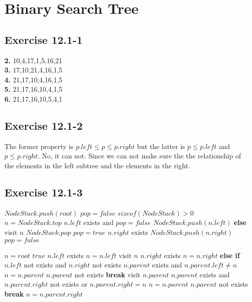 \documentclass[12pt]{article}
\theoremstyle{definition}
\theoremstyle{remark}
\begin{document}
\section{Binary Search Tree}
\subsection*{Exercise 12.1-1}
\textbf{2.} 10,4,17,1,5,16,21\\
\textbf{3.} 17,10,21,4,16,1,5\\
\textbf{4.} 21,17,10,4,16,1,5\\
\textbf{5.} 21,17,16,10,4,1,5\\
\textbf{6.} 21,17,16,10,5,4,1
\subsection*{Exercise 12.1-2}
The former property is $p.left\le p\le p.right$ but the latter is $p\le p.left$ and $p\le p.right$. No, it can not. Since we can not make sure the the relationship of the elements in the left subtree and the elements in the right.
\subsection*{Exercise 12.1-3}
\begin{codebox}
\li $NodeStack.push(root)$
\li $pop=false$
\li \While $sizeof(NodeStack)>0$ \label{li:while}
\li \quad $n=NodeStack.top$
\li \quad \If $n.left$ exists and $pop = false$ \label{li:if}
\li \qquad $NodeStack.push(n.left)$
\li \quad \textbf{else}
\li \qquad visit $n$
\li \qquad $NodeStack.pop$
\li \qquad $pop = true$
\li \qquad \If $n.right$ exists \label{li:if}
\li \quad \qquad $NodeStack.push(n.right)$
\li \quad \qquad $pop = false$
\end{codebox}
\begin{codebox}
\li $n=root$
\li \While $true$ \label{li:while}
\li \quad \While $n.left$ exists \label{li:while}
\li \qquad $n=n.left$
\li \quad visit $n$
\li \quad \If $n.right$ exists \label{li:if}
\li \qquad $n=n.right$
\li \quad \textbf{else if} $n.left$ not exists and $n.right$ not exists
\li \qquad \While $n.parent$ exists and $n.parent.left\ne n$
\li \qquad \quad $n=n.parent$
\li \qquad \If $n.parent$ not exists \label{li:if}
\li \qquad \quad \textbf{break}
\li \qquad visit $n.parent$
\li \qquad \While $n.parent$ exists and $n.parent.right$ not exists or $n.parent.right=n$
\li \qquad \quad $n=n.parent$
\li \qquad \If $n.parent$ not exists \label{li:if}
\li \qquad \quad \textbf{break}
\li \qquad $n=n.parent.right$
\end{codebox}
\end{document}
